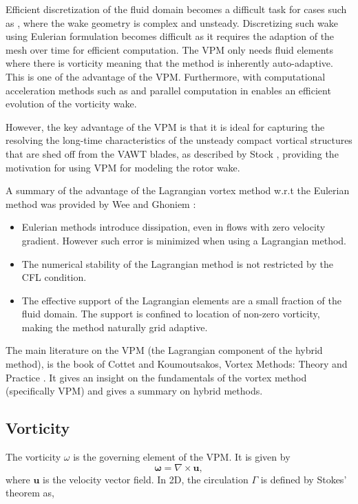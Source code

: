 Efficient discretization of the fluid domain becomes a difficult task for cases such as , where the wake geometry is complex and unsteady. Discretizing such wake using Eulerian formulation becomes difficult as it requires the adaption of the mesh over time for efficient computation. The VPM only needs fluid elements where there is vorticity meaning that the method is inherently auto-adaptive. This is one of the advantage of the VPM. Furthermore, with computational acceleration methods such as  and parallel computation in  enables an efficient evolution of the vorticity wake. 

However, the key advantage of the VPM is that it is ideal for capturing the resolving the long-time characteristics of the unsteady compact vortical structures that are shed off from the VAWT blades, as described by Stock \cite{Stock2010a}, providing the motivation for using VPM for modeling the rotor wake.

A summary of the advantage of the Lagrangian vortex method w.r.t the Eulerian method was provided by Wee and Ghoniem \cite{Wee2006a}:
\begin{itemize}
\item Eulerian methods introduce dissipation, even in flows with zero velocity gradient. However such error is minimized when using a Lagrangian method.
\item The numerical stability of the Lagrangian method is not restricted by the CFL condition.
\item The effective support of the Lagrangian elements are a small fraction of the fluid domain. The support is confined to location of non-zero vorticity, making the method naturally grid adaptive.
\end{itemize}

The main literature on the VPM (the Lagrangian component of the hybrid method), is the book of Cottet and Koumoutsakos, Vortex Methods: Theory and Practice \cite{Cottet2000a}. It gives an insight on the fundamentals of the vortex method (specifically VPM) and gives a summary on hybrid methods.

\subsection{Vorticity}
The vorticity $\omega$ is the governing element of the VPM. It is given by
	\begin{equation}
	\mathbf{\omega} = \nabla \times \mathbf{u},
	\label{eq:lag_vort}
	\end{equation}
where $\mathbf{u}$ is the velocity vector field. In 2D, the circulation $\Gamma$ is defined by Stokes' theorem as,

